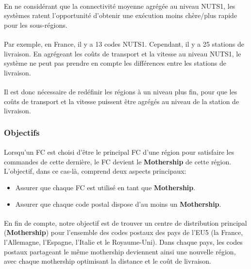 \paragraph{}
\vspace{-2em}
En ne considérant que la connectivité moyenne agrégée au niveau NUTS1, les systèmes ratent l'opportunité d'obtenir une exécution moins chère/plus rapide pour les sous-régions.
\paragraph{}
\vspace{-2em}
Par exemple, en France, il y a 13 codes NUTS1. Cependant, il y a 25 stations de livraison. En agrégeant les coûts de transport et la vitesse au niveau NUTS1, le système ne peut pas prendre en compte les différences entre les stations de livraison.
\paragraph{}
\vspace{-2em}
Il est donc nécessaire de redéfinir les régions à un niveau plus fin, pour que les coûts de transport et la vitesse puissent être agrégés au niveau de la station de livraison.

\subsubsection{Objectifs}
\paragraph{}
\vspace{-2em}
Lorsqu'un FC est choisi d'être le principal FC d'une région pour satisfaire les commandes de cette dernière, le FC devient le \textbf{Mothership} de cette région.
L'objectif, dans ce cas-là, comprend deux aspects principaux:
    \begin{itemize}
    \item Assurer que chaque FC est utilisé en tant que \textbf{Mothership}.
    \item Assurer que chaque code postal dispose d'au moins un \textbf{Mothership}. 
    \end{itemize}
\paragraph{}
\vspace{-2em}
En fin de compte, notre objectif est de trouver un centre de distribution principal (\textbf{Mothership}) pour l'ensemble des codes postaux des pays de l'EU5 (la France, l'Allemagne, l'Espagne, l'Italie et le Royaume-Uni). Dans chaque pays, les codes postaux partageant le même mothership deviennent ainsi une nouvelle région, avec chaque mothership optimisant la distance et le coût de livraison.

